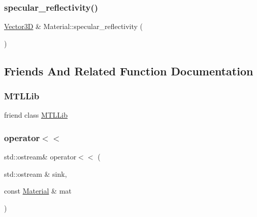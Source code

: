 \mbox{\label{classMaterial_a927c720ad76f97c4619dca4a1b609b26}} 
\subsubsection{\texorpdfstring{specular\_reflectivity()}{specular\_reflectivity()}}
{\footnotesize\ttfamily \mbox{\hyperlink{classVector3D}{Vector3D}} \& Material\+::specular\+\_\+reflectivity (\begin{DoxyParamCaption}{ }\end{DoxyParamCaption})}



\subsection{Friends And Related Function Documentation}
\mbox{\label{classMaterial_aa4d43ed50061aeb4600daf1e3f7706ac}} 
\subsubsection{\texorpdfstring{MTLLib}{MTLLib}}
{\footnotesize\ttfamily friend class \mbox{\hyperlink{classMTLLib}{M\+T\+L\+Lib}}\hspace{0.3cm}{\ttfamily [friend]}}

\mbox{\label{classMaterial_acf2af134f767709233736d54356180be}} 
\subsubsection{\texorpdfstring{operator$<$$<$}{operator<<}}
{\footnotesize\ttfamily std\+::ostream\& operator$<$$<$ (\begin{DoxyParamCaption}\item[{std\+::ostream \&}]{sink,  }\item[{const \mbox{\hyperlink{classMaterial}{Material}} \&}]{mat }\end{DoxyParamCaption})\hspace{0.3cm}{\ttfamily [friend]}}



